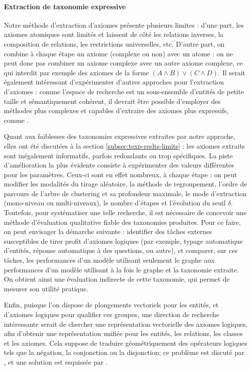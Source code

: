 \paragraph{Extraction de taxonomie expressive}


Notre méthode d'extraction d'axiomes présente plusieurs limites : d'une part, les axiomes atomiques sont limités et laissent de côté les relations inverses, la composition de relations, les restrictions universelles, etc. D'autre part, on combine à chaque étape un axiome (complexe ou non) avec un atome : on ne peut donc pas combiner un axiome complexe avec un autre axiome complexe, ce qui interdit par exemple des axiomes de la forme $(A \land B) \lor (C \land D)$. Il serait également intéressant d'expérimenter d'autres approches pour l'extraction d'axiomes : comme l'espace de recherche est un sous-ensemble d'entités de petite taille et sémantiquement cohérent, il devrait être possible d'employer des méthodes plus complexes et capables d'extraire des axiomes plus expressifs, comme \cite{vlog2019carral}.

Quant aux faiblesses des taxonomies expressives extraites par notre approche, elles ont été discutées à la section \ref{subsec:texp-reslts-limits} : les axiomes extraits sont inégalement informatifs, parfois redondants ou trop spécifiques. La piste d'amélioration la plus évidente consiste à expérimenter des valeurs différentes pour les paramètres. Ceux-ci sont en effet nombreux, à chaque étape : on peut modifier les modalités du tirage aléatoire, la méthode de regroupement, l'ordre de parcours de l'arbre de clustering et sa profondeur maximale, le mode d'extraction (mono-niveau ou multi-niveaux), le nombre d'étapes et l'évolution du seuil $\delta$. Toutefois, pour systématiser une telle recherche, il est nécessaire de concevoir une méthode d'évaluation qualitative fiable des taxonomies produites. Pour ce faire, on peut envisager la démarche suivante : identifier des tâches externes susceptibles de tirer profit d'axiomes logiques (par exemple, typage automatique d'entités, réponse automatique à des questions, ou autre), et comparer, sur ces tâches, les performances d'un modèle utilisant seulement le graphe aux performances d'un modèle utilisant à la fois le graphe et la taxonomie extraite. On obtient ainsi une évaluation indirecte de cette taxonomie, qui permet de mesurer son utilité pratique.



Enfin, puisque l'on dispose de plongements vectoriels pour les entités, et d'axiomes logiques pour qualifier ces groupes, une direction de recherche intéressante serait de chercher une représentation vectorielle des axiomes logiques, afin d'obtenir une représentation unifiée pour les entités, les relations, les classes et les axiomes. 
Cela suppose de traduire géométriquement des opérateurs logiques tels que la négation, la conjonction ou la disjonction; ce problème est discuté par
\cite{gutierrez2018knowledge}, et une solution est esquissée par \cite{hao2019universal}.
